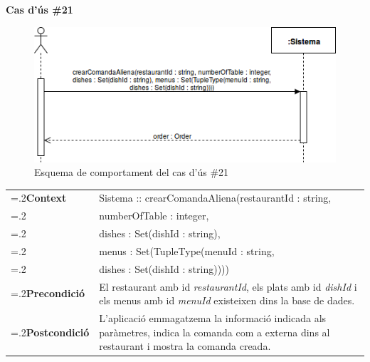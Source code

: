 \clearpage
\noindent\textbf{\large Cas d'ús \#21}\\
\begin{figure}[H]
\centering
\includegraphics[scale=0.6]{Figures/casdus_21.png}
\caption{Esquema de comportament del cas d'ús \#21}
\end{figure}
\begin{table}[h]
\noindent
\begin{tabularx}{\linewidth}{
>{\hsize=.2\hsize}X%
>{\hsize=0.8\hsize}X%
}
\textbf{Context} 		& Sistema :: crearComandaAliena(restaurantId : string, \\
						& numberOfTable : integer, \\
						& dishes : Set(dishId : string), \\
						& menus : Set(TupleType(menuId : string, \\
						& dishes : Set(dishId : string)))) \\
\textbf{Precondició} 	& El restaurant amb id \textit{restaurantId}, els plats amb id \textit{dishId} i els menus amb id \textit{menuId} existeixen dins la base de dades. \\
\textbf{Postcondició}	& L'aplicació emmagatzema la informació indicada als paràmetres, indica la comanda com a externa dins al restaurant i mostra la comanda creada. \\
\end{tabularx}
\label{}
\end{table}

